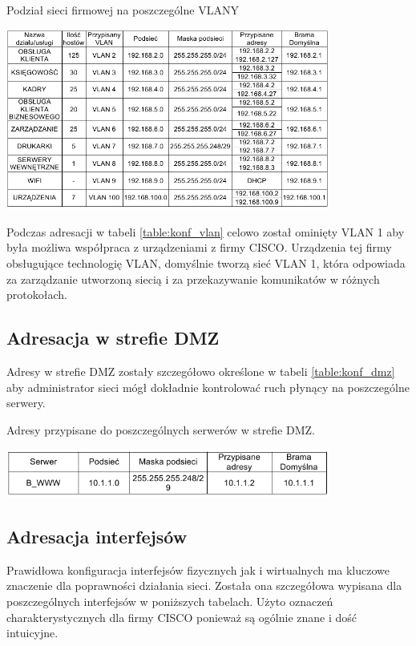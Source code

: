 \documentclass{report}
\begin{document}
\begin{table}[H]
\caption{Podział sieci firmowej na poszczególne VLANY}
\label{table:konf_vlan}
 \centering
      \includegraphics[width=0.8\textwidth]{./obrazki/ip/ip_vlan.png}
\end{table}

Podczas adresacji w tabeli \ref{table:konf_vlan} celowo został ominięty VLAN 1 aby była możliwa współpraca z urządzeniami z firmy CISCO.
Urządzenia tej firmy  obsługujące technologię VLAN, domyślnie tworzą sieć VLAN 1, która odpowiada za zarządzanie utworzoną siecią i za
 przekazywanie komunikatów w różnych protokołach.

\subsection{Adresacja w strefie DMZ}
Adresy w strefie DMZ zostały szczegółowo określone w tabeli \ref{table:konf_dmz} aby administrator sieci mógł dokładnie kontrolować ruch płynący na poszczególne serwery.
\begin{table}[H]
\caption{Adresy przypisane do poszczególnych serwerów w strefie DMZ.}
\label{table:konf_dmz}
 \centering
      \includegraphics[width=0.8\textwidth]{./obrazki/ip/ip_dmz.png}
\end{table}

\subsection{Adresacja interfejsów }
Prawidłowa konfiguracja interfejsów fizycznych jak i wirtualnych ma kluczowe znaczenie dla poprawności działania sieci. Została ona szczegółowa wypisana
dla poszczególnych interfejsów w poniższych tabelach. Użyto oznaczeń charakterystycznych dla firmy CISCO ponieważ są ogólnie znane i dość 
intuicyjne.
\end{document}
